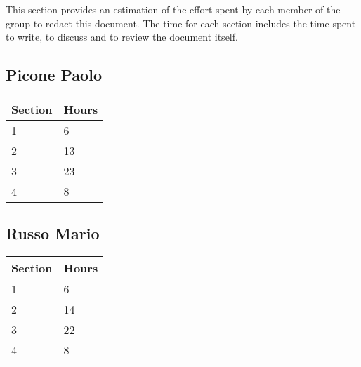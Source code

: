 This section provides an estimation of the effort spent by each member of the group to redact this document. The time for each section includes the time spent to write, to discuss and to review the document itself.\\


\subsection*{Picone Paolo}
\begin{tabular}{|p{7cm}|p{7cm}|}
    \hline
    \textbf{Section} & \textbf{Hours}\\
    \hline
    1 & 6\\
    \hline
    2 & 13\\
    \hline
    3 & 23\\
    \hline
    4 & 8\\
    \hline
\end{tabular}


\subsection*{Russo Mario}
\begin{tabular}{|p{7cm}|p{7cm}|}
    \hline
    \textbf{Section} & \textbf{Hours}\\
    \hline
    1 & 6\\
    \hline
    2 & 14\\
    \hline
    3 & 22\\
    \hline
    4 & 8\\
    \hline
\end{tabular}
